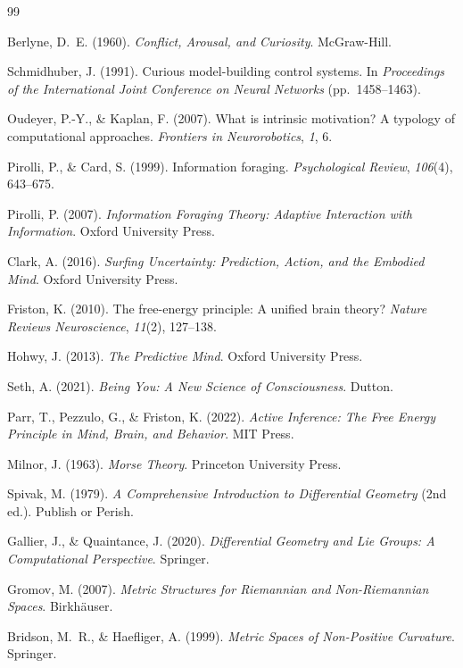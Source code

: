 \documentclass[12pt, a4paper]{article}
\theoremstyle{plain}
\theoremstyle{definition}
\theoremstyle{remark}
\begin{document}
\begin{thebibliography}{99}

Berlyne, D.~E. (1960).
\textit{Conflict, Arousal, and Curiosity}.
McGraw-Hill.

Schmidhuber, J. (1991).
Curious model-building control systems.
In \textit{Proceedings of the International Joint Conference
on Neural Networks} (pp.~1458--1463).

Oudeyer, P.-Y., \& Kaplan, F. (2007).
What is intrinsic motivation? A typology of computational
approaches.
\textit{Frontiers in Neurorobotics}, \textit{1}, 6.

Pirolli, P., \& Card, S. (1999).
Information foraging.
\textit{Psychological Review}, \textit{106}(4), 643--675.

Pirolli, P. (2007).
\textit{Information Foraging Theory: Adaptive Interaction
with Information}.
Oxford University Press.


Clark, A. (2016).
\textit{Surfing Uncertainty: Prediction, Action, and the
Embodied Mind}.
Oxford University Press.

Friston, K. (2010).
The free-energy principle: A unified brain theory?
\textit{Nature Reviews Neuroscience}, \textit{11}(2),
127--138.

Hohwy, J. (2013).
\textit{The Predictive Mind}.
Oxford University Press.

Seth, A. (2021).
\textit{Being You: A New Science of Consciousness}.
Dutton.

Parr, T., Pezzulo, G., \& Friston, K. (2022).
\textit{Active Inference: The Free Energy Principle in Mind,
Brain, and Behavior}.
MIT Press.


Milnor, J. (1963).
\textit{Morse Theory}.
Princeton University Press.

Spivak, M. (1979).
\textit{A Comprehensive Introduction to Differential
Geometry} (2nd ed.).
Publish or Perish.

Gallier, J., \& Quaintance, J. (2020).
\textit{Differential Geometry and Lie Groups: A Computational
Perspective}.
Springer.

Gromov, M. (2007).
\textit{Metric Structures for Riemannian and Non-Riemannian
Spaces}.
Birkh\"{a}user.

Bridson, M.~R., \& Haefliger, A. (1999).
\textit{Metric Spaces of Non-Positive Curvature}.
Springer.

\end{thebibliography}
\end{document}
